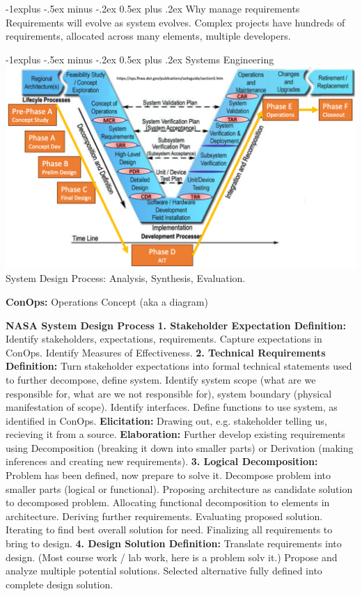 \documentclass[letterpaper, 8pt]{extarticle}
\makeatletter
\renewcommand{\section}{\@startsection{section}{1}{0mm}%
                                {-1explus -.5ex minus -.2ex}%
                                {0.5ex plus .2ex}%
                                {\normalfont\small\bfseries}}
\renewcommand{\subsection}{\@startsection{subsection}{2}{0mm}%
                                {-1explus -.5ex minus -.2ex}%
                                {0.5ex plus .2ex}%
                                {\normalfont\tiny\bfseries}}
\makeatother
\begin{document}
\begin{multicols*}{5}
\subsection{Why manage requirements}
Requirements will evolve as system evolves.
Complex projects have hundreds of requirements, allocated across many elements, multiple developers.

\section{Systems Engineering}
\includegraphics[width=\linewidth]{SCR-20241218-ouqp.png}
System Design Process:
Analysis, Synthesis, Evaluation.

\textbf{ConOps:} Operations Concept (aka a diagram)

\textbf{NASA System Design Process}
\textbf{1. Stakeholder Expectation Definition:}
Identify stakeholders, expectations, requirements. Capture expectations in ConOps. Identify Measures of Effectiveness.
\textbf{2. Technical Requirements Definition:}
Turn stakeholder expectations into formal technical statements used to further decompose, define system.
Identify system scope (what are we responsible for, what are we not responsible for), system boundary (physical manifestation of scope).
Identify interfaces. Define functions to use system, as identified in ConOps.
\textbf{Elicitation:} Drawing out, e.g. stakeholder telling us, recieving it from a source.
\textbf{Elaboration:} Further develop existing requirements using Decomposition (breaking it down into smaller parts) or Derivation (making inferences and creating new requirements).
\textbf{3. Logical Decomposition:}
Problem has been defined, now prepare to solve it.
Decompose problem into smaller parts (logical or functional).
Proposing architecture as candidate solution to decomposed problem.
Allocating functional decomposition to elements in architecture.
Deriving further requirements.
Evaluating proposed solution.
Iterating to find best overall solution for need.
Finalizing all requirements to bring to design.
\textbf{4. Design Solution Definition:}
Translate requirements into design. (Most course work / lab work, here is a problem solv it.)
Propose and analyze multiple potential solutions.
Selected alternative fully defined into complete design solution.


\end{multicols*}
\end{document}
